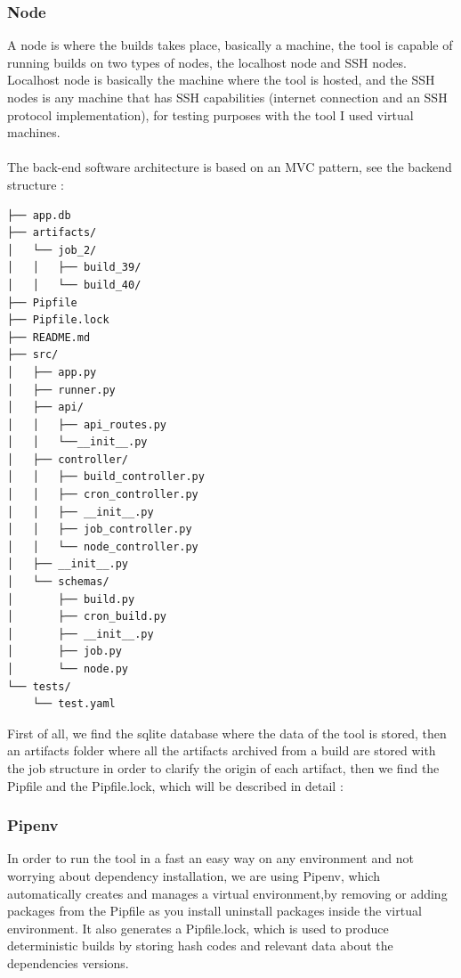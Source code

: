 \documentclass{article}
\begin{document}
\subsubsection{Node}

A node is where the builds takes place, basically a machine, the tool is capable of running builds on two types of nodes, the localhost node and SSH nodes. Localhost node is basically the machine where the tool is hosted, and the SSH nodes is any machine that has SSH capabilities (internet connection and an SSH protocol implementation), for testing purposes with the tool I used virtual machines.
~\\
~\\
The back-end software architecture is based on an MVC pattern, see the backend structure :

\begin{lstlisting}[style=ascii-tree]
├── app.db
├── artifacts/
│   └── job_2/
│   │   ├── build_39/
│   │   └── build_40/      
├── Pipfile
├── Pipfile.lock
├── README.md
├── src/
│   ├── app.py
│   ├── runner.py
│   ├── api/
│   │   ├── api_routes.py
│   │   └──__init__.py
│   ├── controller/
│   │   ├── build_controller.py
│   │   ├── cron_controller.py
│   │   ├── __init__.py
│   │   ├── job_controller.py
│   │   └── node_controller.py
│   ├── __init__.py
│   └── schemas/
│       ├── build.py
│       ├── cron_build.py
│       ├── __init__.py
│       ├── job.py
│       └── node.py
└── tests/
    └── test.yaml
\end{lstlisting}

First of all, we find the sqlite database where the data of the tool is stored, then an artifacts folder where all the artifacts archived from a build are stored with the job structure in order to clarify the origin of each artifact, then we find the Pipfile and the Pipfile.lock, which will be described in detail :

\subsubsection{Pipenv}

In order to run the tool in a fast an easy way on any environment and not worrying about dependency installation, we are using Pipenv, which automatically creates and manages a virtual environment,by removing or adding packages from the Pipfile as you install uninstall packages inside the virtual environment. It also generates a Pipfile.lock, which is used to produce deterministic builds by storing hash codes and relevant data about the dependencies versions.
\end{document}
